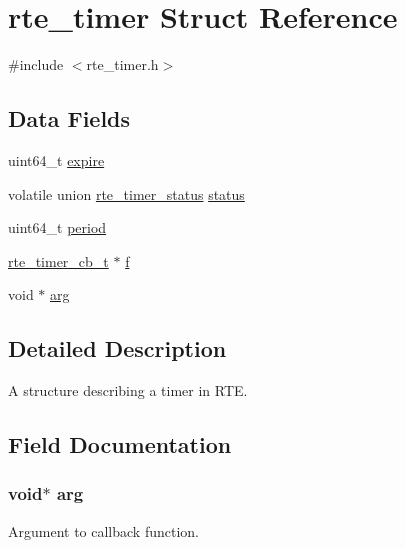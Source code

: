 \hypertarget{structrte__timer}{}\section{rte\+\_\+timer Struct Reference}
\label{structrte__timer}


{\ttfamily \#include $<$rte\+\_\+timer.\+h$>$}

\subsection*{Data Fields}
\begin{DoxyCompactItemize}
\item 
uint64\+\_\+t \hyperlink{structrte__timer_ac9ce2fcaa610ae415e9e65d1d7b48ba2}{expire}
\item 
volatile union \hyperlink{unionrte__timer__status}{rte\+\_\+timer\+\_\+status} \hyperlink{structrte__timer_a3be7bdbca383565f03e859db2f37a0a2}{status}
\item 
uint64\+\_\+t \hyperlink{structrte__timer_a473ee3fcea196f6207eeda1e747746e8}{period}
\item 
\hyperlink{rte__timer_8h_a356e4838f67b60ffba867110c1ef0f7e}{rte\+\_\+timer\+\_\+cb\+\_\+t} $\ast$ \hyperlink{structrte__timer_a58ec0649f525a9e30a03e7559a111538}{f}
\item 
void $\ast$ \hyperlink{structrte__timer_a9ce2ec4812a92cb6ab39f6e81e9173a9}{arg}
\end{DoxyCompactItemize}


\subsection{Detailed Description}
A structure describing a timer in R\+T\+E. 

\subsection{Field Documentation}
\hypertarget{structrte__timer_a9ce2ec4812a92cb6ab39f6e81e9173a9}{}
\subsubsection[{arg}]{\setlength{\rightskip}{0pt plus 5cm}void$\ast$ arg}\label{structrte__timer_a9ce2ec4812a92cb6ab39f6e81e9173a9}
Argument to callback function. \hypertarget{structrte__timer_ac9ce2fcaa610ae415e9e65d1d7b48ba2}{}
